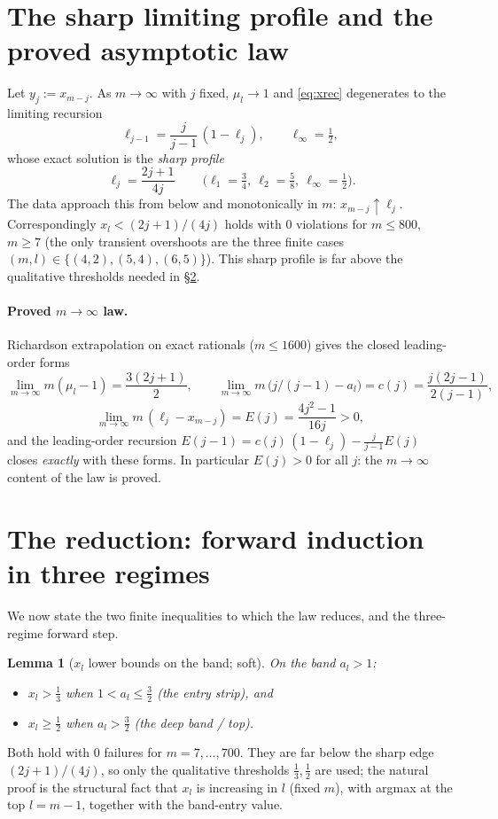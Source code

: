 \documentclass[11pt]{article}
\newtheorem{lemma}{Lemma}
\theoremstyle{definition}
\begin{document}
\section{The sharp limiting profile and the proved asymptotic law}
\label{sec:profile}

Let $y_j:=x_{m-j}$.  As $m\to\infty$ with $j$ fixed, $\mu_l\to1$ and
\eqref{eq:xrec} degenerates to the limiting recursion
\begin{equation}\label{eq:limit}
  \ell_{j-1}=\frac{j}{j-1}\,(1-\ell_j),\qquad \ell_\infty=\tfrac12 ,
\end{equation}
whose exact solution is the \emph{sharp profile}
\begin{equation}\label{eq:sharp}
  \boxed{\ \ell_j=\frac{2j+1}{4j}\ }\qquad
  \big(\ell_1=\tfrac34,\ \ell_2=\tfrac58,\ \ell_\infty=\tfrac12\big).
\end{equation}
The data approach this from below and monotonically in $m$:
$x_{m-j}\uparrow\ell_j$.  Correspondingly $x_l<(2j+1)/(4j)$ holds with
$0$ violations for $m\le800$, $m\ge7$ (the only transient overshoots are
the three finite cases $(m,l)\in\{(4,2),(5,4),(6,5)\}$).  This sharp
profile is far above the qualitative thresholds needed in
\S\ref{sec:reduction}.

\paragraph{Proved $m\to\infty$ law.}  Richardson extrapolation on exact
rationals ($m\le1600$) gives the closed leading-order forms
\[
  \lim_{m\to\infty}m(\mu_l-1)=\frac{3(2j+1)}{2},\qquad
  \lim_{m\to\infty}m\,\big(j/(j-1)-a_l\big)=c(j)=\frac{j(2j-1)}{2(j-1)},
\]
\[
  \lim_{m\to\infty}m\,(\ell_j-x_{m-j})=E(j)=\frac{4j^2-1}{16j}>0 ,
\]
and the leading-order recursion
$E(j-1)=c(j)\,(1-\ell_j)-\tfrac{j}{j-1}E(j)$ closes \emph{exactly} with
these forms.  In particular $E(j)>0$ for all $j$: the $m\to\infty$
content of the law is proved.

\section{The reduction: forward induction in three regimes}
\label{sec:reduction}

We now state the two finite inequalities to which the law reduces, and
the three-regime forward step.

\begin{lemma}[$x_l$ lower bounds on the band; soft]\label{lem:xlb}
On the band $a_l>1$:
\begin{itemize}
\item[(2a)] $x_l>\tfrac13$ when $1<a_l\le\tfrac32$ (the entry strip), and
\item[(2b)] $x_l\ge\tfrac12$ when $a_l>\tfrac32$ (the deep band / top).
\end{itemize}
\end{lemma}
\noindent Both hold with $0$ failures for $m=7,\dots,700$.  They are far
below the sharp edge $(2j+1)/(4j)$, so only the qualitative thresholds
$\tfrac13,\tfrac12$ are used; the natural proof is the structural fact
that $x_l$ is increasing in $l$ (fixed $m$), with argmax at the top
$l=m-1$, together with the band-entry value.
\end{document}
